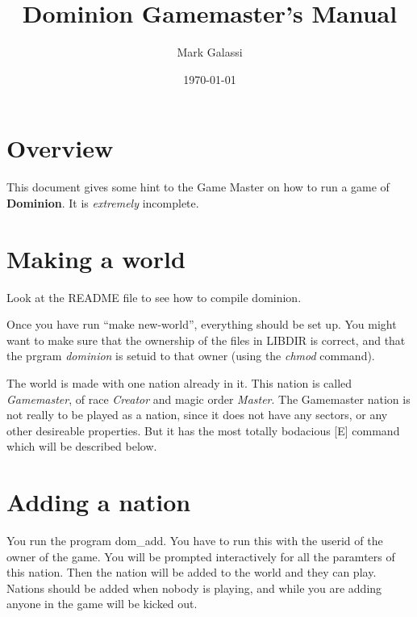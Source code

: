 \pagestyle{headings}



\pagestyle{empty}

\title{Dominion Gamemaster's Manual}

\author{Mark Galassi}

\date{\today}

\maketitle

\pagestyle{headings}

\tableofcontents

\chapter{Overview}
This document gives some hint to the Game Master on how to run a game
of {\bf Dominion}.  It is {\em extremely} incomplete.

\chapter{Making a world}

Look at the README file to see how to compile dominion.

Once you have run ``make new-world'', everything should be set up.
You might want to make sure that the ownership of the files in LIBDIR
is correct, and that the prgram {\em dominion} is setuid to that
owner (using the {\em chmod} command).

The world is made with one nation already in it.  This nation is
called {\em Gamemaster}, of race {\em Creator} and magic order {\em
Master}.  The Gamemaster nation is not really to be played as a
nation, since it does not have any sectors, or any other desireable
properties.  But it has the most totally bodacious [E] command which
will be described below.

\chapter{Adding a nation}

You run the program dom\_add.  You have to run this with the userid of
the owner of the game.  You will be prompted interactively for all the
paramters of this nation.  Then the nation will be added to the world
and they can play.  Nations should be added when nobody is playing,
and while you are adding anyone in the game will be kicked out.

